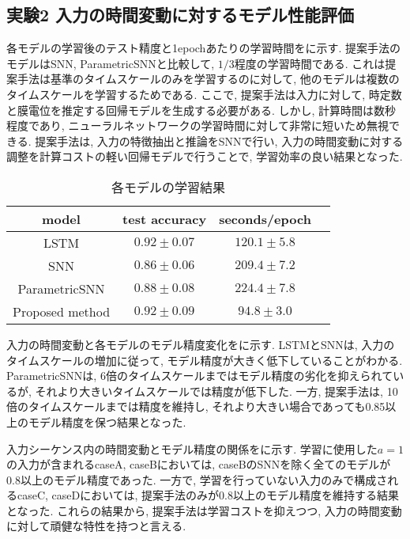 \makeatletter %
\subsection{実験2 入力の時間変動に対するモデル性能評価}

各モデルの学習後のテスト精度と1epochあたりの学習時間をに示す.
提案手法のモデルはSNN, ParametricSNNと比較して, $1/3$程度の学習時間である.
これは提案手法は基準のタイムスケールのみを学習するのに対して, 他のモデルは複数のタイムスケールを学習するためである.
ここで, 提案手法は入力に対して, 時定数と膜電位を推定する回帰モデルを生成する必要がある.
しかし, 計算時間は数秒程度であり, ニューラルネットワークの学習時間に対して非常に短いため無視できる.
提案手法は, 入力の特徴抽出と推論をSNNで行い, 入力の時間変動に対する調整を計算コストの軽い回帰モデルで行うことで, 学習効率の良い結果となった.
\begin{table}[htb]
    \centering
    \caption{各モデルの学習結果}
    \label{sec4:tab:exp2}
    \begin{tabular}{cccc}
        \hline
        \textbf{model}&\textbf{test accuracy}&\textbf{seconds/epoch}\\
        \hline
        LSTM&$0.92\pm0.07$&$120.1\pm5.8$\\
        SNN&$0.86\pm0.06$&$209.4\pm7.2$\\
        ParametricSNN&$0.88\pm0.08$&$224.4\pm7.8$\\
        Proposed method&$0.92\pm0.09$&$94.8\pm3.0$\\
    \end{tabular}
\end{table}

入力の時間変動と各モデルのモデル精度変化をに示す.
LSTMとSNNは, 入力のタイムスケールの増加に従って, モデル精度が大きく低下していることがわかる.
ParametricSNNは, 6倍のタイムスケールまではモデル精度の劣化を抑えられているが, それより大きいタイムスケールでは精度が低下した.
一方, 提案手法は, 10倍のタイムスケールまでは精度を維持し, それより大きい場合であっても0.85以上のモデル精度を保つ結果となった.

入力シーケンス内の時間変動とモデル精度の関係をに示す.
学習に使用した$a=1$の入力が含まれるcaseA, caseBにおいては, caseBのSNNを除く全てのモデルが0.8以上のモデル精度であった.
一方で, 学習を行っていない入力のみで構成されるcaseC, caseDにおいては, 提案手法のみが0.8以上のモデル精度を維持する結果となった.
これらの結果から, 提案手法は学習コストを抑えつつ, 入力の時間変動に対して頑健な特性を持つと言える.